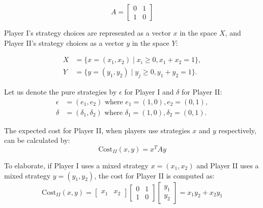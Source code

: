 \documentclass[11pt]{article}
\theoremstyle{boldStyle}
\begin{document}
\begin{equation*}
    A = \begin{bmatrix}
    0 & 1 \\
    1 & 0
    \end{bmatrix}
\end{equation*}

Player I's strategy choices are represented as a vector \( x \) in the space \( X \), and Player II's strategy choices as a vector \( y \) in the space \( Y \):

\begin{equation*} \label{eq:strategies}
    \begin{aligned}
        X &= \{x = (x_1, x_2) \mid x_i \geq 0, x_1 + x_2 = 1\}, \\
        Y &= \{y = (y_1, y_2) \mid y_j \geq 0, y_1 + y_2 = 1\}.
    \end{aligned}
\end{equation*}

Let us denote the pure strategies by \( \epsilon \) for Player I and \( \delta \) for Player II:
\begin{equation*} \label{eq:pure_strategies}
    \begin{aligned}
        \epsilon &= (e_1, e_2) \text{ where } e_1 = (1, 0), e_2 = (0, 1), \\
        \delta &= (\delta_1, \delta_2) \text{ where } \delta_1 = (1, 0), \delta_2 = (0, 1).
    \end{aligned}
\end{equation*}

The expected cost for Player II, when players use strategies \( x \) and \( y \) respectively, can be calculated by:
\begin{equation*} \label{eq:expected_cost}
    \text{Cost}_{II}(x, y) = x^T A y
\end{equation*}

To elaborate, if Player I uses a mixed strategy \( x = (x_1, x_2) \) and Player II uses a mixed strategy \( y = (y_1, y_2) \), the cost for Player II is computed as:
\begin{equation*}
    \text{Cost}_{II}(x, y) = \begin{bmatrix} x_1 & x_2 \end{bmatrix} \begin{bmatrix} 0 & 1 \\ 1 & 0 \end{bmatrix} \begin{bmatrix} y_1 \\ y_2 \end{bmatrix} = x_1 y_2 + x_2 y_1
\end{equation*}
\end{document}
